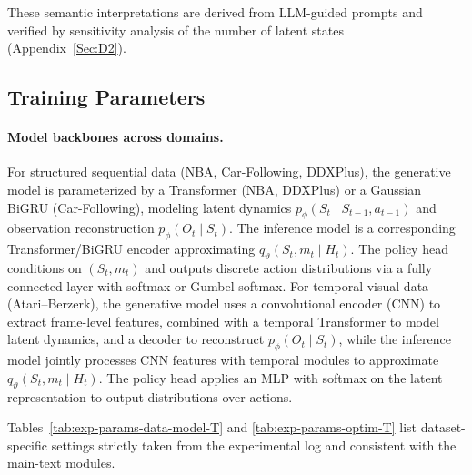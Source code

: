 \documentclass{article} %
\begin{document}
These semantic interpretations are derived from LLM-guided prompts and verified by sensitivity analysis of the number of latent states (Appendix~\ref{Sec:D2}).

\subsection{Training Parameters}
\label{Sec:B7}

\paragraph{Model backbones across domains.}
For structured sequential data (NBA, Car-Following, DDXPlus), the generative model is parameterized
by a Transformer (NBA, DDXPlus) or a Gaussian BiGRU (Car-Following), modeling latent dynamics
$p_\phi(S_t\!\mid\!S_{t-1},a_{t-1})$ and observation reconstruction $p_\phi(O_t\!\mid\!S_t)$.
The inference model is a corresponding Transformer/BiGRU encoder approximating
$q_\vartheta(S_t,m_t\!\mid\!H_t)$.
The policy head conditions on $(S_t,m_t)$ and outputs discrete action distributions via a fully
connected layer with softmax or Gumbel-softmax.
For temporal visual data (Atari--Berzerk), the generative model uses a convolutional encoder (CNN)
to extract frame-level features, combined with a temporal Transformer to model latent dynamics, and
a decoder to reconstruct $p_\phi(O_t\!\mid\!S_t)$, while the inference model jointly processes CNN
features with temporal modules to approximate $q_\vartheta(S_t,m_t\!\mid\!H_t)$. The policy head
applies an MLP with softmax on the latent representation to output distributions over actions.

Tables~\ref{tab:exp-params-data-model-T} and \ref{tab:exp-params-optim-T} list dataset-specific settings strictly taken from the experimental log and consistent with the main-text modules.
\end{document}
